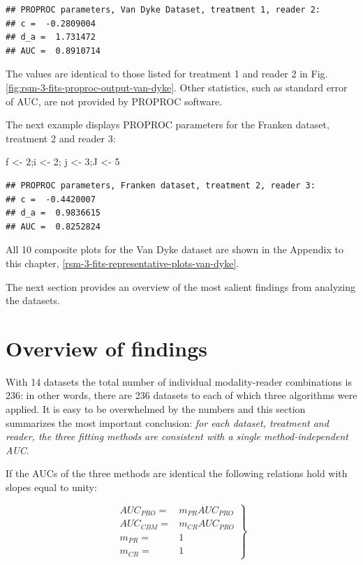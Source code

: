 \documentclass[
]{book}
\newenvironment{Shaded}{\begin{snugshade}}{\end{snugshade}}
\newcommand{\DecValTok}[1]{\textcolor[rgb]{0.00,0.00,0.81}{#1}}
\newcommand{\NormalTok}[1]{#1}
\newcommand{\StringTok}[1]{\textcolor[rgb]{0.31,0.60,0.02}{#1}}
\begin{document}
\begin{verbatim}
## PROPROC parameters, Van Dyke Dataset, treatment 1, reader 2: 
## c =  -0.2809004 
## d_a =  1.731472 
## AUC =  0.8910714
\end{verbatim}

The values are identical to those listed for treatment 1 and reader 2 in Fig. \ref{fig:rsm-3-fits-proproc-output-van-dyke}. Other statistics, such as standard error of AUC, are not provided by PROPROC software.

The next example displays PROPROC parameters for the Franken dataset, treatment 2 and reader 3:

\begin{Shaded}
\begin{Highlighting}[]
\NormalTok{f <-}\StringTok{ }\DecValTok{2}\NormalTok{;i <-}\StringTok{ }\DecValTok{2}\NormalTok{; j <-}\StringTok{ }\DecValTok{3}\NormalTok{;J <-}\StringTok{ }\DecValTok{5}
\end{Highlighting}
\end{Shaded}

\begin{verbatim}
## PROPROC parameters, Franken dataset, treatment 2, reader 3: 
## c =  -0.4420007 
## d_a =  0.9836615 
## AUC =  0.8252824
\end{verbatim}

All 10 composite plots for the Van Dyke dataset are shown in the Appendix to this chapter, \ref{rsm-3-fits-representative-plots-van-dyke}.

The next section provides an overview of the most salient findings from analyzing the datasets.

\hypertarget{rsm-3-fits-overview}{%
\section{Overview of findings}\label{rsm-3-fits-overview}}

With 14 datasets the total number of individual modality-reader combinations is 236: in other words, there are 236 datasets to each of which three algorithms were applied. It is easy to be overwhelmed by the numbers and this section summarizes the most important conclusion: \emph{for each dataset, treatment and reader, the three fitting methods are consistent with a single method-independent AUC}.

If the AUCs of the three methods are identical the following relations hold with slopes equal to unity:

\begin{equation}
\left. 
\begin{aligned}
AUC_{PRO} =& m_{PR} AUC_{PRO}  \\
AUC_{CBM} =& m_{CR} AUC_{PRO} \\
m_{PR}    =& 1 \\
m_{CR}    =& 1
\end{aligned}
\right \}
\label{eq:rsm-3-fits-slopes-equation1}
\end{equation}
\end{document}

